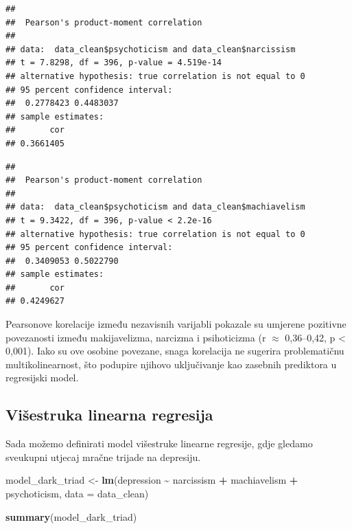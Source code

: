 \documentclass[
]{article}
\newenvironment{Shaded}{\begin{snugshade}}{\end{snugshade}}
\newcommand{\AttributeTok}[1]{\textcolor[rgb]{0.13,0.29,0.53}{#1}}
\newcommand{\FunctionTok}[1]{\textcolor[rgb]{0.13,0.29,0.53}{\textbf{#1}}}
\newcommand{\NormalTok}[1]{#1}
\newcommand{\OtherTok}[1]{\textcolor[rgb]{0.56,0.35,0.01}{#1}}
\newcommand{\SpecialCharTok}[1]{\textcolor[rgb]{0.81,0.36,0.00}{\textbf{#1}}}
\begin{document}
\begin{verbatim}
## 
##  Pearson's product-moment correlation
## 
## data:  data_clean$psychoticism and data_clean$narcissism
## t = 7.8298, df = 396, p-value = 4.519e-14
## alternative hypothesis: true correlation is not equal to 0
## 95 percent confidence interval:
##  0.2778423 0.4483037
## sample estimates:
##       cor 
## 0.3661405
\end{verbatim}

\begin{Shaded}
\end{Shaded}

\begin{verbatim}
## 
##  Pearson's product-moment correlation
## 
## data:  data_clean$psychoticism and data_clean$machiavelism
## t = 9.3422, df = 396, p-value < 2.2e-16
## alternative hypothesis: true correlation is not equal to 0
## 95 percent confidence interval:
##  0.3409053 0.5022790
## sample estimates:
##       cor 
## 0.4249627
\end{verbatim}

Pearsonove korelacije između nezavisnih varijabli pokazale su umjerene
pozitivne povezanosti između makijavelizma, narcizma i psihoticizma (r
\(\approx\) 0,36--0,42, p \textless{} 0,001). Iako su ove osobine
povezane, snaga korelacija ne sugerira problematičnu multikolinearnost,
što podupire njihovo uključivanje kao zasebnih prediktora u regresijski
model.

\subsection{Višestruka linearna
regresija}\label{viux161estruka-linearna-regresija}

Sada možemo definirati model višestruke linearne regresije, gdje gledamo
sveukupni utjecaj mračne trijade na depresiju.

\begin{Shaded}
\begin{Highlighting}[]
\NormalTok{model\_dark\_triad }\OtherTok{\textless{}{-}} \FunctionTok{lm}\NormalTok{(depression }\SpecialCharTok{\textasciitilde{}}\NormalTok{ narcissism }\SpecialCharTok{+}\NormalTok{ machiavelism }\SpecialCharTok{+}\NormalTok{ psychoticism,}
             \AttributeTok{data =}\NormalTok{ data\_clean)}

\FunctionTok{summary}\NormalTok{(model\_dark\_triad)}
\end{Highlighting}
\end{Shaded}
\end{document}
